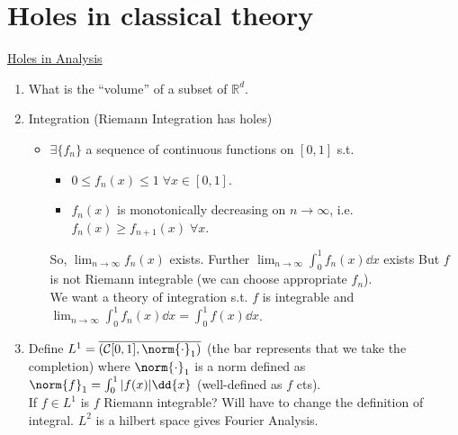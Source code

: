 
\def\npart {II}
\def\nterm {Michaelmas}
\def\nyear {2023}
\def\nlecturer {Dr Sarkar}
\def\ncourse {Probability and Measure}



% 

\setcounter{section}{-1}


    \maketitle
    \tableofcontents

    \section{Holes in classical theory}

    \underline{Holes in Analysis}

    \begin{enumerate}
        \item What is the ``volume'' of a subset of $\mathbb{R}^d$.
        \item Integration (Riemann Integration has holes)
        \begin{itemize}
            \item $\exists \{f_n\}$ a sequence of continuous functions on $[0, 1]$ s.t.
            \begin{itemize}
                \item $0 \leq f_n(x) \leq 1 \; \forall x \in [0, 1]$.
                \item $f_n(x)$ is monotonically decreasing on $n \to \infty$, i.e. $f_n(x) \geq f_{n+1}(x) \; \forall x$.
            \end{itemize}
            So, $\lim_{n \to \infty} f_n(x)$ exists.
            Further $\lim_{n \to \infty} \int_{0}^{1} f_n(x) \dd{x}$ exists
            But $f$ is not Riemann integrable (we can choose appropriate $f_n$). \\
            We want a theory of integration s.t. $f$ is integrable and $\lim_{n \to \infty} \int_{0}^{1} f_n(x) \dd{x} = \int_{0}^{1} f(x) \dd{x}$.
        \end{itemize}
        \item Define $L^1 = \overline{(\mathcal{C}[0, 1], \norm{\cdot}_1)}$ (the bar represents that we take the completion) where $\norm{\cdot}_1$ is a norm defined as $\norm{f}_1  = \int_0^1 |f(x)| \dd{x}$ (well-defined as $f$ cts). \\
        If $f \in L^1$ is $f$ Riemann integrable? Will have to change the definition of integral.
        $L^2$ is a hilbert space gives Fourier Analysis.
    \end{enumerate}

